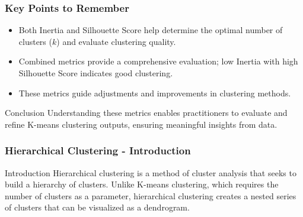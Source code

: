\documentclass[aspectratio=169]{beamer}
\begin{document}
\begin{frame}[fragile]
    \frametitle{Key Points to Remember}
    \begin{itemize}
        \item Both Inertia and Silhouette Score help determine the optimal number of clusters (\(k\)) and evaluate clustering quality.
        \item Combined metrics provide a comprehensive evaluation; low Inertia with high Silhouette Score indicates good clustering.
        \item These metrics guide adjustments and improvements in clustering methods.
    \end{itemize}
    
    \begin{block}{Conclusion}
        Understanding these metrics enables practitioners to evaluate and refine K-means clustering outputs, ensuring meaningful insights from data.
    \end{block}
\end{frame}

\begin{frame}[fragile]
    \frametitle{Hierarchical Clustering - Introduction}
    \begin{block}{Introduction}
        Hierarchical clustering is a method of cluster analysis that seeks to build a hierarchy of clusters. Unlike K-means clustering, which requires the number of clusters as a parameter, hierarchical clustering creates a nested series of clusters that can be visualized as a dendrogram.
    \end{block}
\end{frame}
\end{document}
